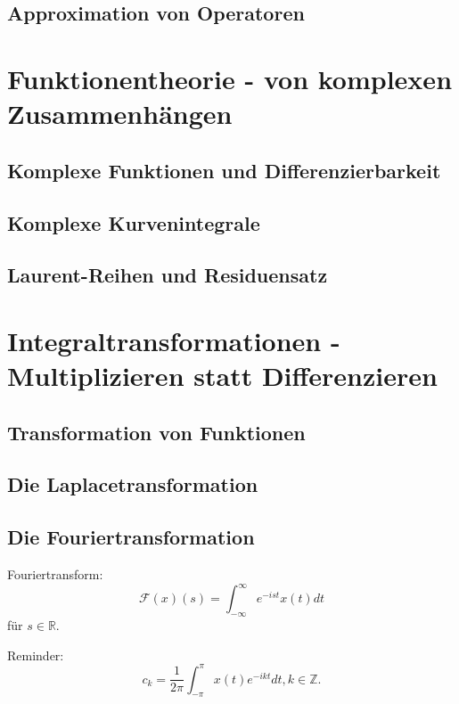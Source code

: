 \documentclass[a4paper]{article}
\begin{document}
\subsection{Approximation von Operatoren}



\newpage
\section{Funktionentheorie - von komplexen Zusammenhängen}
\subsection{Komplexe Funktionen und Differenzierbarkeit}


\subsection{Komplexe Kurvenintegrale}


\subsection{Laurent-Reihen und Residuensatz}



\newpage
\section{Integraltransformationen - Multiplizieren statt Differenzieren}
\subsection{Transformation von Funktionen}


\subsection{Die Laplacetransformation}


\subsection{Die Fouriertransformation}
Fouriertransform:
$$\mathcal{F}(x)(s) = \int_{-\infty}^{\infty}e^{-ist}x(t) dt$$
für $s \in \mathbb{R}$.

Reminder:
$$c_k = \frac{1}{2\pi} \int_{-\pi}^{\pi} x(t) e^{-ikt} dt, k \in \mathbb{Z}.$$
\end{document}
